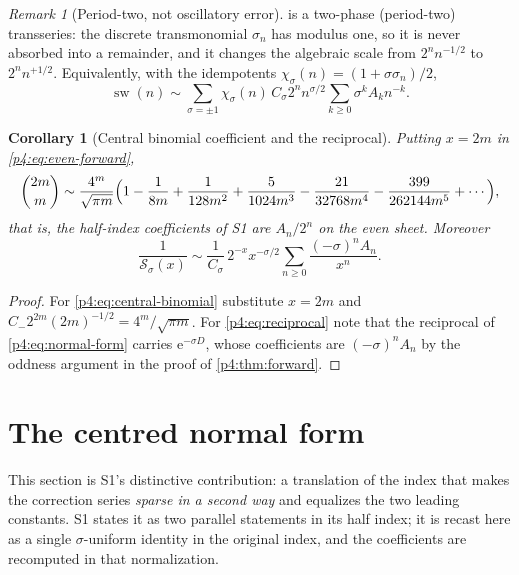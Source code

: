 \documentclass[11pt,a4paper,oneside]{book}
\theoremstyle{plain}
\newtheorem{corollary}[theorem]{Corollary}
\theoremstyle{definition}
\theoremstyle{remark}
\newtheorem{remark}[theorem]{Remark}
\newcommand{\e}{\mathrm{e}}
\begin{document}
\begin{remark}[Period-two, not oscillatory error]
\label{p4:rem:transmonomial}
 is a two-phase (period-two) transseries: the
discrete transmonomial $\sigma_n$ has modulus one, so it is never absorbed
into a remainder, and it changes the algebraic scale from $2^nn^{-1/2}$ to
$2^nn^{+1/2}$.  Equivalently, with the idempotents
$\chi_\sigma(n)=(1+\sigma\sigma_n)/2$,
\[
  \operatorname{sw}(n)\sim\sum_{\sigma=\pm1}\chi_\sigma(n)\,
  C_\sigma 2^{n}n^{\sigma/2}\sum_{k\ge0}\sigma^{k}A_kn^{-k}.
\]
\end{remark}

\begin{corollary}[Central binomial coefficient and the reciprocal]
\label{p4:cor:central-and-reciprocal}
Putting $x=2m$ in \cref{p4:eq:even-forward},
\begin{equation}
  \binom{2m}{m}\sim\frac{4^{m}}{\sqrt{\pi m}}
  \Bigl(1-\frac1{8m}+\frac1{128m^{2}}+\frac5{1024m^{3}}
        -\frac{21}{32768m^{4}}-\frac{399}{262144m^{5}}+\cdots\Bigr),
  \label{p4:eq:central-binomial}
\end{equation}
that is, the half-index coefficients of \textsf{S1} are $A_n/2^{n}$ on the
even sheet.  Moreover
\begin{equation}
  \frac1{\mathcal S_\sigma(x)}\sim
  \frac1{C_\sigma}\,2^{-x}x^{-\sigma/2}
  \sum_{n\ge0}\frac{(-\sigma)^{n}A_n}{x^{n}} .
  \label{p4:eq:reciprocal}
\end{equation}
\end{corollary}

\begin{proof}
For \cref{p4:eq:central-binomial} substitute $x=2m$ and
$C_-2^{2m}(2m)^{-1/2}=4^m/\sqrt{\pi m}$.  For \cref{p4:eq:reciprocal} note
that the reciprocal of \cref{p4:eq:normal-form} carries $\e^{-\sigma D}$,
whose coefficients are $(-\sigma)^nA_n$ by the oddness argument in the proof
of \cref{p4:thm:forward}.
\end{proof}

\section{The centred normal form}
\label{p4:sec:centred}

\begin{sourcebox}
This section is \textsf{S1}'s distinctive contribution: a translation of the
index that makes the correction series \emph{sparse in a second way} and
equalizes the two leading constants.  \textsf{S1} states it as two parallel
statements in its half index; it is recast here as a single $\sigma$-uniform
identity in the original index, and the coefficients are recomputed in that
normalization.
\end{sourcebox}
\end{document}
